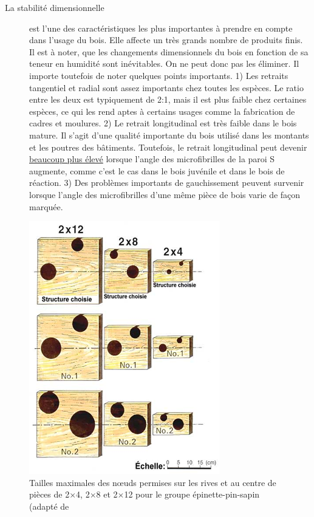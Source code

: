 \begin{description}
	\item[La stabilité dimensionnelle] est l'une des caractéristiques les plus importantes à prendre en compte dans l'usage du bois. Elle affecte un très grands nombre de produits finis. Il est à noter, que les changements dimensionnels du bois en fonction de sa teneur en humidité sont inévitables. On ne peut donc pas les éliminer. Il importe toutefois de noter quelques points importants. 1) Les retraits tangentiel et radial sont assez importants chez toutes les espèces. Le ratio entre les deux est  typiquement de 2:1, mais il est plus faible chez certaines espèces, ce qui les rend aptes à certains usages comme la fabrication de cadres et moulures. 2) Le retrait longitudinal est très faible dans le bois mature. Il s'agit d'une qualité importante du bois utilisé dans les montants et les poutres des bâtiments. Toutefois, le retrait longitudinal peut devenir \hyperref[gonflement]{beaucoup plus élevé} lorsque l'angle des microfibrilles de la paroi S augmente, comme c'est le cas dans le bois juvénile et dans le bois de réaction. 3) Des problèmes importants de gauchissement peuvent survenir lorsque l'angle des microfibrilles d'une même pièce de bois varie de façon marquée.
\end{description}

\begin{figure}[!h]
	\centering
	\includegraphics[width=0.5\linewidth]{./img/ch8_noeuds}
	\caption{Tailles maximales des nœuds permises sur les rives et au centre de pièces de 2$\times$4, 2$\times$8 et 2$\times$12 pour le groupe épinette-pin-sapin (adapté de \cite{jozsa1994discussion}}
	\label{fig:noeuds}
\end{figure}

